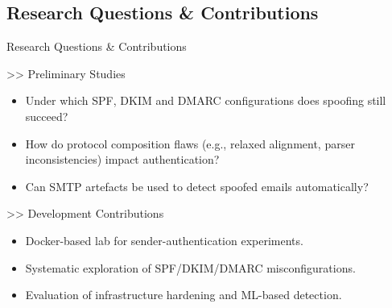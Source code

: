 \documentclass[aspectratio=169,10pt]{beamer}
\begin{document}
\subsection{Research Questions \& Contributions}
\begin{frame}{Research Questions \& Contributions}
  \transdissolve
  \begin{block}{>> Preliminary Studies}
        \begin{itemize}
            \item Under which SPF, DKIM and DMARC configurations does spoofing still succeed?
            \item How do protocol composition flaws (e.g., relaxed alignment, parser inconsistencies) impact authentication?
            \item Can SMTP artefacts be used to detect spoofed emails automatically?
        \end{itemize}
    \end{block}
    \vspace{0.4cm}
    \begin{block}{>> Development Contributions}
        \begin{itemize}
            \item Docker-based lab for sender-authentication experiments.
            \item Systematic exploration of SPF/DKIM/DMARC misconfigurations.
            \item Evaluation of infrastructure hardening and ML-based detection.
        \end{itemize}
    \end{block}
\end{frame}
\end{document}
